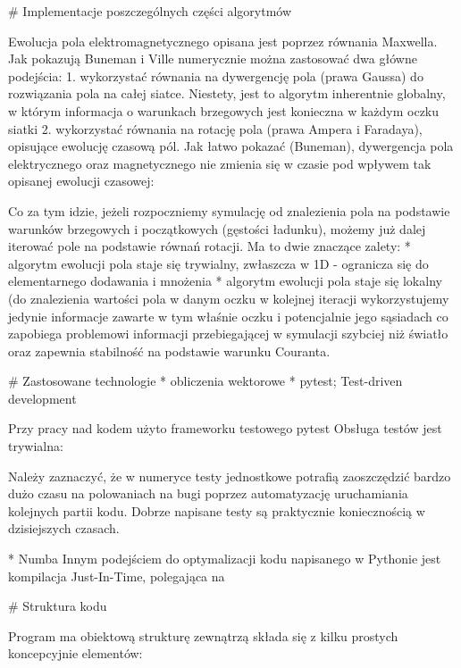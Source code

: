 # Implementacje poszczególnych części algorytmów

Ewolucja pola elektromagnetycznego opisana jest poprzez równania Maxwella. Jak pokazują Buneman i Ville %
numerycznie można zastosować dwa główne podejścia: %
1. wykorzystać równania na dywergencję pola (prawa Gaussa) do rozwiązania pola na całej siatce. Niestety, jest to
algorytm inherentnie globalny, w którym informacja o warunkach brzegowych jest konieczna w każdym oczku siatki
2. wykorzystać równania na rotację pola (prawa Ampera i Faradaya), opisujące ewolucję czasową pól. Jak łatwo pokazać (Buneman),
dywergencja pola elektrycznego oraz magnetycznego nie zmienia się w czasie pod wpływem tak opisanej ewolucji czasowej:

Co za tym idzie, jeżeli rozpoczniemy symulację od znalezienia pola na podstawie warunków brzegowych i początkowych (gęstości
ładunku), możemy już dalej iterować pole na podstawie równań rotacji. Ma to dwie znaczące zalety:
* algorytm ewolucji pola staje się trywialny, zwłaszcza w 1D - ogranicza się do elementarnego dodawania i mnożenia %
* algorytm ewolucji pola staje się lokalny (do znalezienia wartości pola w danym oczku w kolejnej iteracji wykorzystujemy
jedynie informacje zawarte w tym właśnie oczku i potencjalnie jego sąsiadach %
co zapobiega problemowi informacji przebiegającej w symulacji szybciej niż światło oraz zapewnia stabilność na podstawie
warunku Couranta.

# Zastosowane technologie
* obliczenia wektorowe
* pytest; Test-driven development

Przy pracy nad kodem użyto frameworku testowego pytest %
Obsługa testów jest trywialna:

Należy zaznaczyć, że w numeryce testy jednostkowe potrafią zaoszczędzić bardzo dużo czasu na polowaniach na bugi
poprzez automatyzację uruchamiania kolejnych partii kodu. Dobrze napisane testy są praktycznie koniecznością w dzisiejszych
czasach. %

* Numba
Innym podejściem do optymalizacji kodu napisanego w Pythonie jest kompilacja Just-In-Time, polegająca na %

# Struktura kodu

Program ma obiektową strukturę zewnątrzą %
składa się z kilku prostych koncepcyjnie elementów:

